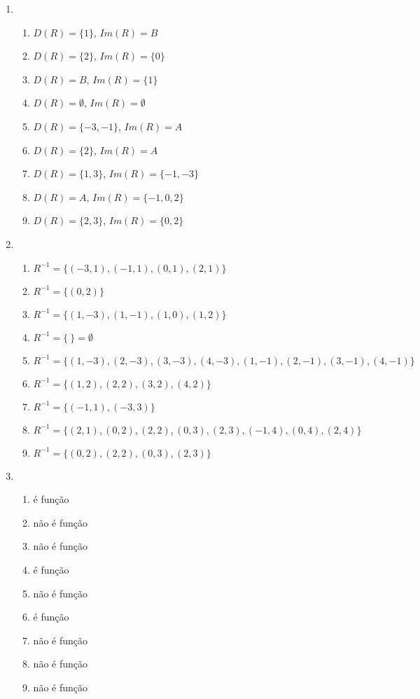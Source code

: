 \documentclass[a4paper]{article}
\begin{document}
\begin{enumerate}
\item \ %

  \begin{enumerate}
  \item $D(R) = \{1\}$, $Im(R)=B$
  \item $D(R) = \{2\}$, $Im(R)=\{0\}$
  \item $D(R) = B$, $Im(R)=\{1\}$
  \item $D(R) = \emptyset$, $Im(R)=\emptyset$
  \item $D(R) = \{-3,-1\}$, $Im(R)=A$
  \item $D(R) = \{2\}$, $Im(R)=A$
  \item $D(R) = \{1,3\}$, $Im(R)=\{-1,-3\}$
  \item $D(R) = A$, $Im(R)=\{-1,0,2\}$
  \item $D(R) = \{2,3\}$, $Im(R)=\{0,2\}$
  \end{enumerate}

\newpage

\item \ %
  \begin{enumerate}
  \item $R^{-1} = \{(-3,1), (-1,1), (0,1), (2,1)\}$
  \item $R^{-1} = \{(0,2)\}$
  \item $R^{-1} = \{(1,-3), (1,-1), (1,0), (1,2)\}$
  \item $R^{-1} = \{\ \} = \emptyset$
  \item $R^{-1} = \{(1,-3), (2,-3), (3,-3), (4,-3), (1,-1), (2,-1), (3,-1), (4,-1)\}$
  \item $R^{-1} = \{(1,2), (2,2), (3,2), (4,2)\}$
  \item $R^{-1} = \{(-1,1), (-3,3)\}$
  \item $R^{-1} = \{(2,1), (0,2), (2,2), (0,3), (2,3), (-1,4), (0,4), (2,4)\}$
  \item $R^{-1} = \{(0,2), (2,2), (0,3), (2,3)\}$
  \end{enumerate}

\item \ %
  \begin{enumerate}
  \item é função
  \item não é função
  \item não é função
  \item é função
  \item não é função
  \item é função
  \item não é função
  \item não é função
  \item não é função
  \end{enumerate}

\end{enumerate}
\end{document}
